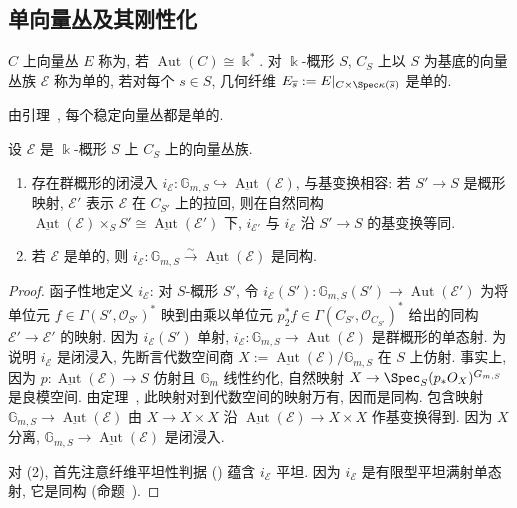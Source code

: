 \subsection{单向量丛及其刚性化}\label{src:9.2.6-subsection}
\begin{definition}[单向量丛]\label{src:9.2.19}
$C$ 上向量丛 $E$ 称为, 若 $\operatorname{Aut}(C)\cong\Bbbk^*$. 对 $\Bbbk$-概形 $S$, $C_S$ 上以 $S$ 为基底的向量丛族 $\mathcal E$ 称为单的, 若对每个 $s\in S$, 几何纤维 $\mathcal E_{\overline s}:=\mathcal E|_{C\times\Spec\kappa(\overline s)}$ 是单的.
\end{definition}
由引理~, 每个稳定向量丛都是单的.
\begin{proposition}\label{src:9.2.20}
设 $\mathcal E$ 是 $\Bbbk$-概形 $S$ 上 $C_S$ 上的向量丛族.
\begin{enumerate}[(1)]
\item 存在群概形的闭浸入 $i_{\mathcal E}:\mathbb G_{m,S}\hookrightarrow\underline{\operatorname{Aut}}(\mathcal E)$, 与基变换相容: 若 $S'\to S$ 是概形映射, $\mathcal E'$ 表示 $\mathcal E$ 在 $C_{S'}$ 上的拉回, 则在自然同构 $\underline{\operatorname{Aut}}(\mathcal E)\times_SS'\cong\underline{\operatorname{Aut}}(\mathcal E')$ 下, $i_{\mathcal E'}$ 与 $i_{\mathcal E}$ 沿 $S'\to S$ 的基变换等同.
\item 若 $\mathcal E$ 是单的, 则 $i_{\mathcal E}:\mathbb G_{m,S}\xrightarrow{\sim}\underline{\operatorname{Aut}}(\mathcal E)$ 是同构.
\end{enumerate}
\end{proposition}
\begin{proof}
函子性地定义 $i_{\mathcal E}$: 对 $S$-概形 $S'$, 令 $i_{\mathcal E}(S'):\mathbb G_{m,S}(S')\to\operatorname{Aut}(\mathcal E')$ 为将单位元 $f\in\Gamma(S',\mathcal O_{S'})^*$ 映到由乘以单位元 $p_2^*f\in\Gamma(C_{S'},\mathcal O_{C_{S'}})^*$ 给出的同构 $\mathcal E'\to\mathcal E'$ 的映射. 因为 $i_{\mathcal E}(S')$ 单射, $i_{\mathcal E}:\mathbb G_{m,S}\to\operatorname{Aut}(\mathcal E)$ 是群概形的单态射. 为说明 $i_{\mathcal E}$ 是闭浸入, 先断言代数空间商 $X:=\underline{\operatorname{Aut}}(\mathcal E)/\mathbb G_{m,S}$ 在 $S$ 上仿射. 事实上, 因为 $p:\underline{\operatorname{Aut}}(\mathcal E)\to S$ 仿射且 $\mathbb G_m$ 线性约化, 自然映射 $X\to\Spec_S(p_*\mathcal O_X)^{\mathbb G_{m,S}}$ 是良模空间. 由定理~, 此映射对到代数空间的映射万有, 因而是同构. 包含映射 $\mathbb G_{m,S}\to\underline{\operatorname{Aut}}(\mathcal E)$ 由 $X\to X\times X$ 沿 $\underline{\operatorname{Aut}}(\mathcal E)\to X\times X$ 作基变换得到. 因为 $X$ 分离, $\mathbb G_{m,S}\to\underline{\operatorname{Aut}}(\mathcal E)$ 是闭浸入.

对 (2), 首先注意纤维平坦性判据 () 蕴含 $i_{\mathcal E}$ 平坦. 因为 $i_{\mathcal E}$ 是有限型平坦满射单态射, 它是同构 (命题~).
\end{proof}
